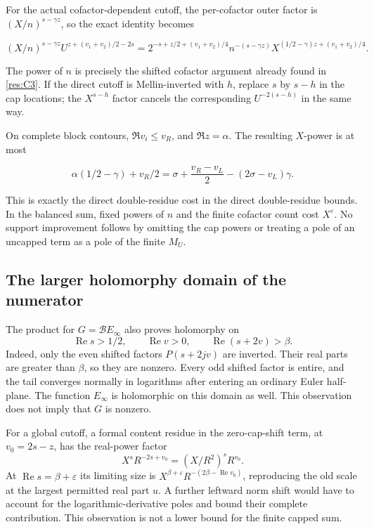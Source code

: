 \documentclass[11pt]{article}
\numberwithin{equation}{section}
\newcommand{\B}{\mathcal B}
\newcommand{\Rea}{\operatorname{Re}}
\begin{document}
For the actual cofactor-dependent cutoff, the per-cofactor outer factor
is \((X/n)^{s-\gamma z}\), so the exact identity becomes

\begin{equation}\label{res:C19}
(X/n)^{s-\gamma z}
 U^{z+(v_1+v_2)/2-2s}
 =
 2^{-s+z/2+(v_1+v_2)/4}
 n^{-(s-\gamma z)}
 X^{(1/2-\gamma)z+(v_1+v_2)/4}.
\end{equation}

The power of \(n\) is precisely the shifted cofactor argument already
found in \eqref{res:C3}. If the direct cutoff is Mellin-inverted with
\(h\), replace \(s\) by \(s-h\) in the cap locations; the \(X^{s-h}\)
factor cancels the corresponding \(U^{-2(s-h)}\) in the same way.

On complete block contours, \(\Re v_i\leq v_R\), and \(\Re z=\alpha\).
The resulting \(X\)-power is at most

\begin{equation}\label{res:C20}
\alpha(1/2-\gamma)+v_R/2
 =\sigma+\frac{v_R-v_L}{2}-(2\sigma-v_L)\gamma.
\end{equation}

This is exactly the direct double-residue cost in the direct
double-residue bounds. In the balanced sum, fixed powers of \(n\) and
the finite cofactor count cost \(X^\varepsilon\). No support improvement
follows by omitting the cap powers or treating a pole of an uncapped
term as a pole of the finite \(M_U\).


\subsection{The larger holomorphy domain of the numerator}

The product for \(G=\B E_\infty\) also proves holomorphy on
\[
 \Rea s>1/2,\qquad \Rea v>0,\qquad \Rea(s+2v)>\beta.
\]
Indeed, only the even shifted factors \(P(s+2jv)\) are inverted.
Their real parts are greater than \(\beta\), so they are nonzero.
Every odd shifted factor is entire, and the tail converges normally
in logarithms after entering an ordinary Euler half-plane.
The function \(E_\infty\) is holomorphic on this domain as well.
This observation does not imply that \(G\) is nonzero.

For a global cutoff, a formal content residue in the zero-cap-shift
term, at \(v_0=2s-z\), has the real-power factor
\[
 X^sR^{-2s+v_0}=(X/R^2)^sR^{v_0}.
\]
At \(\Rea s=\beta+\varepsilon\) its limiting size is
\(X^{\beta+\varepsilon}R^{-(2\beta-\Rea v_0)}\), reproducing
the old scale at the largest permitted real part \(u\).
A further leftward norm shift would have to account for the
logarithmic-derivative poles and bound their complete contribution.
This observation is not a lower bound for the finite capped sum.
\end{document}
